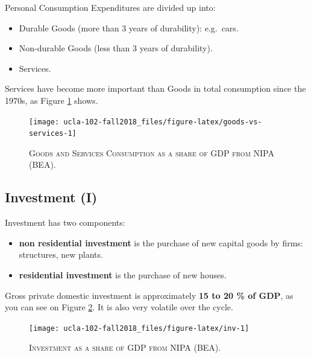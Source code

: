 \documentclass[]{book}
\providecommand{\tightlist}{%
  \setlength{\itemsep}{0pt}\setlength{\parskip}{0pt}}
\theoremstyle{definition}
\theoremstyle{definition}
\theoremstyle{definition}
\theoremstyle{remark}
\begin{document}
Personal Consumption Expenditures are divided up into:

\begin{itemize}
\tightlist
\item
  Durable Goods (more than 3 years of durability): e.g.~cars.
\item
  Non-durable Goods (less than 3 years of durability).
\item
  Services.
\end{itemize}

Services have become more important than Goods in total consumption
since the 1970s, as Figure \ref{fig:goods-vs-services} shows.




\begin{figure}

{\centering \texttt{[image: ucla-102-fall2018\_files/figure-latex/goods-vs-services-1]} 

}

\caption{\textsc{Goods and Services Consumption as
a share of GDP from NIPA (BEA)}.}\label{fig:goods-vs-services}
\end{figure}

\hypertarget{inv}{\subsection{Investment (I)}\label{inv}}

Investment has two components:

\begin{itemize}
\tightlist
\item
  \textbf{non residential investment} is the purchase of new capital
  goods by firms: structures, new plants.
\item
  \textbf{residential investment} is the purchase of new houses.
\end{itemize}

Gross private domestic investment is approximately \textbf{15 to 20 \%
of GDP}, as you can see on Figure \ref{fig:inv}. It is also very
volatile over the cycle.



\begin{figure}

{\centering \texttt{[image: ucla-102-fall2018\_files/figure-latex/inv-1]} 

}

\caption{\textsc{Investment as a share of GDP from NIPA (BEA)}.}\label{fig:inv}
\end{figure}
\end{document}

